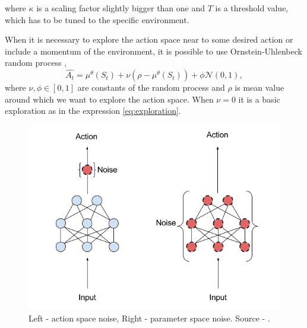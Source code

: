 where $\kappa$ is a scaling factor slightly bigger than one and $T$ is a threshold value, which has to be tuned to the specific environment.
\par When it is necessary to explore the action space near to some desired action or include a momentum of the environment, it is possible to use Ornstein-Uhlenbeck random process \citep{lilicrap2015}, 
\begin{equation}
\hat{A_t} = \mu^\theta(S_t)  + \nu (\rho - \mu^\theta(S_t)) + \phi \mathcal{N}(0, 1),
\end{equation}
where $\nu, \phi \in [0, 1]$ are constants of the random process and $\rho$ is mean value around which we want to explore the action space. When $\nu = 0$ it is a basic exploration as in the expression \eqref{eq:exploration}.

\begin{figure}[H]
\centering
\includegraphics[scale=0.5]{fig/perturbations.png}
\caption[Exploration noise types]{Left - action space noise, Right - parameter space noise. Source - \cite{plappert2017}.}
\label{fig:exploration}
\end{figure}